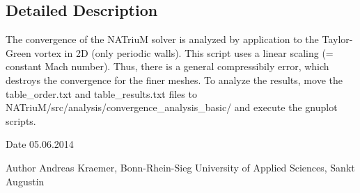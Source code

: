 \subsection{Detailed Description}
The convergence of the NATriuM solver is analyzed by application to the Taylor-\/Green vortex in 2D (only periodic walls). This script uses a linear scaling (= constant Mach number). Thus, there is a general compressibily error, which destroys the convergence for the finer meshes. To analyze the results, move the table\_\-order.txt and table\_\-results.txt files to NATriuM/src/analysis/convergence\_\-analysis\_\-basic/ and execute the gnuplot scripts. \begin{DoxyDate}{Date}
05.06.2014 
\end{DoxyDate}
\begin{DoxyAuthor}{Author}
Andreas Kraemer, Bonn-\/Rhein-\/Sieg University of Applied Sciences, Sankt Augustin 
\end{DoxyAuthor}
